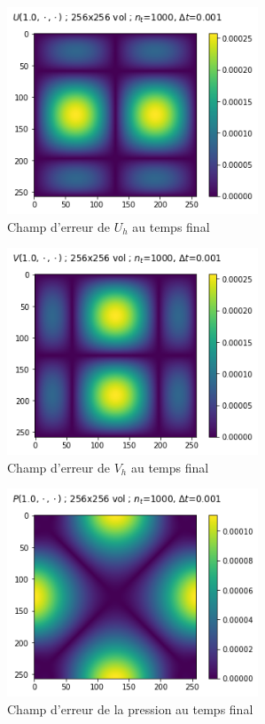 \begin{figure}[htp]
    \centering
    \includegraphics[width=7.5cm]{Images/stokes/sip/Uh.png}
    \caption{Champ d'erreur de $U_h$ au temps final}
\end{figure}

\begin{figure}[htp]
    \centering
    \includegraphics[width=7.5cm]{Images/stokes/sip/Vh.png}
    \caption{Champ d'erreur de $V_h$ au temps final}
\end{figure}

\begin{figure}[htp]
    \centering
    \includegraphics[width=7.5cm]{Images/stokes/sip/Ph.png}
    \caption{Champ d'erreur de la pression au temps final}
\end{figure}

